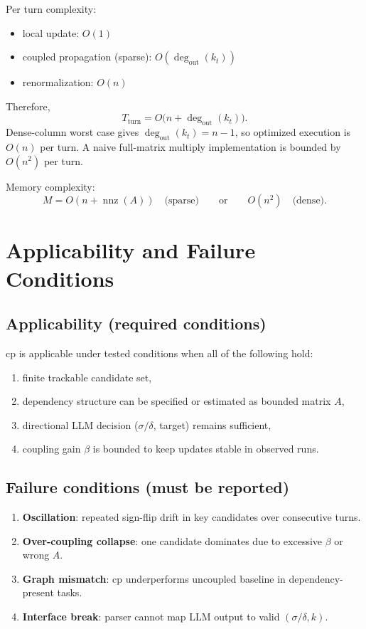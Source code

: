 \documentclass[11pt,a4paper]{article}
\begin{document}
Per turn complexity:
\begin{itemize}
  \item local update: \(O(1)\)
  \item coupled propagation (sparse): \(O(\deg_{\text{out}}(k_t))\)
  \item renormalization: \(O(n)\)
\end{itemize}

Therefore,
\[
T_{\text{turn}} = O\big(n + \deg_{\text{out}}(k_t)\big).
\]
Dense-column worst case gives \(\deg_{\text{out}}(k_t)=n-1\), so optimized execution is \(O(n)\) per turn.
A naive full-matrix multiply implementation is bounded by \(O(n^2)\) per turn.

Memory complexity:
\[
M = O(n+\operatorname{nnz}(A))\quad\text{(sparse)}\qquad\text{or}\qquad O(n^2)\quad\text{(dense)}.
\]

\section{Applicability and Failure Conditions}
\subsection{Applicability (required conditions)}
cp is applicable under tested conditions when all of the following hold:
\begin{enumerate}
  \item finite trackable candidate set,
  \item dependency structure can be specified or estimated as bounded matrix \(A\),
  \item directional LLM decision (\(\sigma/\delta\), target) remains sufficient,
  \item coupling gain \(\beta\) is bounded to keep updates stable in observed runs.
\end{enumerate}

\subsection{Failure conditions (must be reported)}
\begin{enumerate}
  \item \textbf{Oscillation}: repeated sign-flip drift in key candidates over consecutive turns.
  \item \textbf{Over-coupling collapse}: one candidate dominates due to excessive \(\beta\) or wrong \(A\).
  \item \textbf{Graph mismatch}: cp underperforms uncoupled baseline in dependency-present tasks.
  \item \textbf{Interface break}: parser cannot map LLM output to valid \((\sigma/\delta, k)\).
\end{enumerate}
\end{document}
